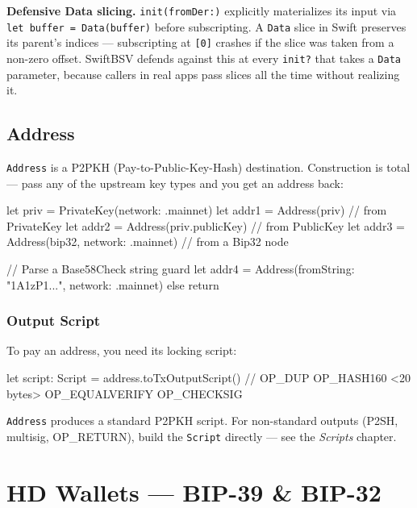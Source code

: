 \documentclass[a4paper, 11pt, openany]{book}
\begin{document}
\begin{notebox}
\textbf{Defensive Data slicing.} \texttt{init(fromDer:)} explicitly materializes its input via \texttt{let buffer = Data(buffer)} before subscripting. A \texttt{Data} slice in Swift preserves its parent's indices --- subscripting at \texttt{[0]} crashes if the slice was taken from a non-zero offset. SwiftBSV defends against this at every \texttt{init?} that takes a \texttt{Data} parameter, because callers in real apps pass slices all the time without realizing it.
\end{notebox}

\section{Address}

\texttt{Address} is a P2PKH (Pay-to-Public-Key-Hash) destination. Construction is total --- pass any of the upstream key types and you get an address back:

\begin{forthbox}
let priv = PrivateKey(network: .mainnet)
let addr1 = Address(priv)                      // from PrivateKey
let addr2 = Address(priv.publicKey)            // from PublicKey
let addr3 = Address(bip32, network: .mainnet)  // from a Bip32 node

// Parse a Base58Check string
guard let addr4 = Address(fromString: "1A1zP1...", network: .mainnet)
else { return }
\end{forthbox}

\subsection{Output Script}

To pay an address, you need its locking script:

\begin{forthbox}
let script: Script = address.toTxOutputScript()
// OP_DUP OP_HASH160 <20 bytes> OP_EQUALVERIFY OP_CHECKSIG
\end{forthbox}

\texttt{Address} produces a standard P2PKH script. For non-standard outputs (P2SH, multisig, OP\_RETURN), build the \texttt{Script} directly --- see the \emph{Scripts} chapter.

\chapter{HD Wallets — BIP-39 \& BIP-32}
\end{document}
